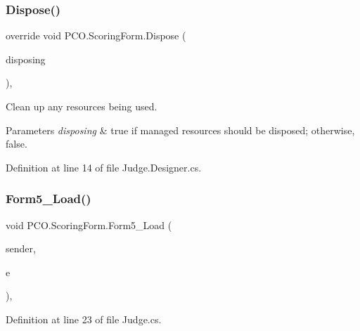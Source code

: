 \mbox{\label{classPCO_1_1ScoringForm_a8ba62b61ae76aeca6b9dbb7daa4b00a7}} 
\subsubsection{\texorpdfstring{Dispose()}{Dispose()}}
{\footnotesize\ttfamily override void P\+C\+O.\+Scoring\+Form.\+Dispose (\begin{DoxyParamCaption}\item[{bool}]{disposing }\end{DoxyParamCaption})\hspace{0.3cm}{\ttfamily [inline]}, {\ttfamily [protected]}}



Clean up any resources being used. 


\begin{DoxyParams}{Parameters}
{\em disposing} & true if managed resources should be disposed; otherwise, false.\\
\hline
\end{DoxyParams}


Definition at line 14 of file Judge.\+Designer.\+cs.

\mbox{\label{classPCO_1_1ScoringForm_a6824aa9a4bc47a736f4089ca458e9ec1}} 
\subsubsection{\texorpdfstring{Form5\+\_\+\+Load()}{Form5\_Load()}}
{\footnotesize\ttfamily void P\+C\+O.\+Scoring\+Form.\+Form5\+\_\+\+Load (\begin{DoxyParamCaption}\item[{object}]{sender,  }\item[{Event\+Args}]{e }\end{DoxyParamCaption})\hspace{0.3cm}{\ttfamily [inline]}, {\ttfamily [private]}}



Definition at line 23 of file Judge.\+cs.

